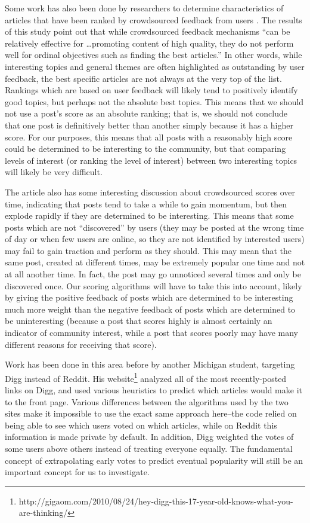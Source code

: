 \documentclass{acm_proc_article-sp}
\begin{document}
Some work has also been done by researchers to determine characteristics of articles that
have been ranked by crowdsourced feedback from users \cite{askalidis:crowdsourced}.
The results of this study point out that while crowdsourced feedback mechanisms ``can be
relatively effective for \ldots promoting content of high quality, they do not perform well
for ordinal objectives such as finding the best articles.''  In other words, while interesting
topics and general themes are often highlighted as outstanding by user feedback, the best
specific articles are not always at the very top of the list.  Rankings which are based on
user feedback will likely tend to positively identify good
topics, but perhaps not the absolute best topics.  This means that we should not use a post's
score as an absolute ranking; that is, we should not conclude that one post is definitively better
than another simply because it has a higher score.  For our purposes, this means that
all posts with a reasonably high score could be determined to be interesting to the
community, but that comparing levels of interest (or ranking the level of interest)
between two interesting topics will likely be very difficult.

The article also has some
interesting discussion about crowdsourced scores over time, indicating that posts tend
to take a while to gain momentum, but then explode rapidly if they are determined to
be interesting.  This means that some posts which are not ``discovered'' by users (they
may be posted at the wrong time of day or when few users are online, so they are not
identified by interested users) may fail to gain traction and perform as they should.
This may mean that the same post, created at different times, may be extremely popular
one time and not at all another time.  In fact, the post may go unnoticed several times
and only be discovered once.  Our scoring algorithms will have to take this
into account, likely by giving the positive feedback of posts which are determined to
be interesting much more weight than the negative feedback of posts which are determined
to be uninteresting (because a post that scores highly is almost certainly
an indicator of community interest, while a post that scores poorly may have many
different reasons for receiving that score).

Work has been done in this area before by another Michigan student, targeting
Digg instead of Reddit. His
website\footnote{http://gigaom.com/2010/08/24/hey-digg-this-17-year-old-knows-what-you-are-thinking/}
analyzed all of the most recently-posted links on Digg, and used various
heuristics to predict which articles would make it to the front page. Various
differences between the algorithms used by the two sites make it impossible to
use the exact same approach here--the code relied on being able to see which
users voted on which articles, while on Reddit this information is made private
by default. In addition, Digg weighted the votes of some users above others
instead of treating everyone equally. The fundamental concept of extrapolating
early votes to predict eventual popularity will still be an important concept
for us to investigate.
\end{document}
